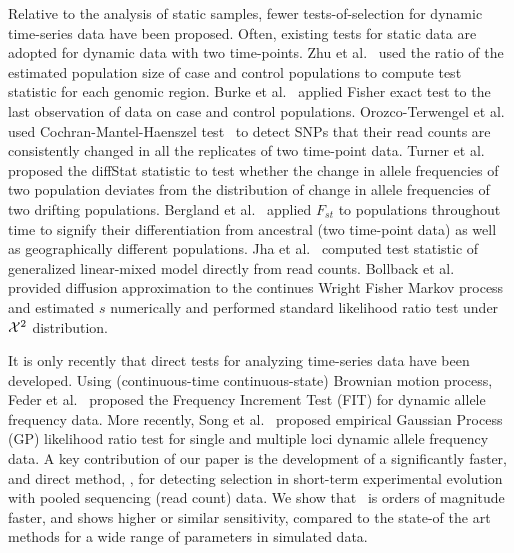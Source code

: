 \documentclass[11pt]{article}
\def\comale{\text{{\sc Comale}}}
\begin{document}
Relative to the analysis of static samples, fewer tests-of-selection
for dynamic time-series data have been proposed. Often, existing tests
for static data are adopted for dynamic data with two time-points. Zhu
et al.~\cite{zhou2011experimental} used the ratio of the estimated
population size of case and control populations to compute test
statistic for each genomic region. Burke et al.~\cite{burke2010genome}
applied Fisher exact test to the last observation of data on case and
control populations.  Orozco-Terwengel et
al.~\cite{orozco2012adaptation} used Cochran-Mantel-Haenszel
test~\cite{agresti2011categorical} to detect SNPs that their read
counts are consistently changed in all the replicates of two
time-point data.  Turner et al.~\cite{turner2011population} proposed
the diffStat statistic to test whether the change in allele
frequencies of two population deviates from the distribution of change
in allele frequencies of two drifting populations.  Bergland et
al.~\cite{bergland2014genomic} applied $F_{st}$ to populations
throughout time to signify their differentiation from ancestral (two
time-point data) as well as geographically different populations.  Jha
et al.~\cite{jha2015whole} computed test statistic of generalized
linear-mixed model directly from read counts.  Bollback et
al.~\cite{bollback2008estimation} provided diffusion approximation to
the continues Wright Fisher Markov process and estimated $s$
numerically and performed standard likelihood ratio test under ${\cal X}^2$
distribution. 

It is only recently that direct tests for analyzing time-series data
have been developed. Using (continuous-time continuous-state) Brownian
motion process, Feder et al.~\cite{feder2014Identifying} proposed the
Frequency Increment Test (FIT) for dynamic allele frequency data. More
recently, Song et al.~\cite{Terhorst2015Multi} proposed empirical
Gaussian Process (GP) likelihood ratio test for single and multiple
loci dynamic allele frequency data. A key contribution of our paper is
the development of a significantly faster, and direct method, \comale,
for detecting selection in short-term experimental evolution with
pooled sequencing (read count) data.  We show that \comale\ is orders
of magnitude faster, and shows higher or similar sensitivity, compared
to the state-of the art methods for a wide range of parameters in
simulated data.  
\end{document}
